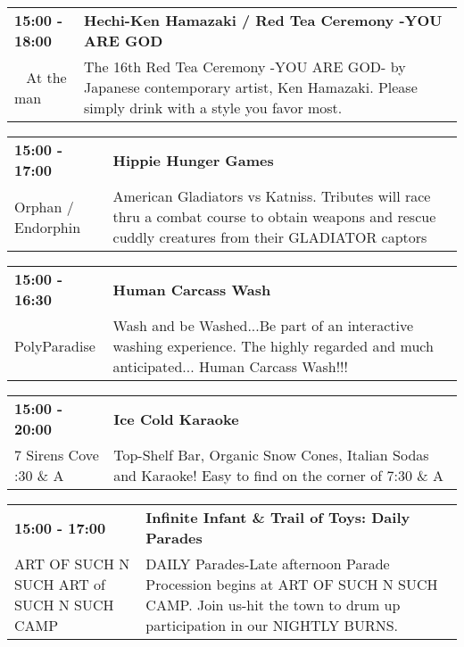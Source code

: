 \begin{tabular}{ p{1in} p{2.2in} }
    \textbf{15:00 - 18:00} & \textbf{Hechi-Ken Hamazaki / Red Tea Ceremony -YOU ARE GOD} \\
    ~ \newline At the man & The 16th Red Tea Ceremony -YOU ARE GOD- by Japanese contemporary artist, Ken Hamazaki. Please simply drink with a style you favor most. \\
    \hline 
\end{tabular}
    
\begin{tabular}{ p{1in} p{2.2in} }
    \textbf{15:00 - 17:00} & \textbf{Hippie Hunger Games} \\
    Orphan / Endorphin \newline  & American Gladiators vs Katniss. Tributes will race thru a combat course to obtain weapons and rescue cuddly creatures from their GLADIATOR captors \\
    \hline 
\end{tabular}
    
\begin{tabular}{ p{1in} p{2.2in} }
    \textbf{15:00 - 16:30} & \textbf{Human Carcass Wash} \\
    PolyParadise \newline  & Wash and be Washed...Be part of an interactive washing experience.
The highly regarded and much anticipated... Human Carcass Wash!!! \\
    \hline 
\end{tabular}
    
\begin{tabular}{ p{1in} p{2.2in} }
    \textbf{15:00 - 20:00} & \textbf{Ice Cold Karaoke} \\
    7 Sirens Cove \newline 7:30 \& A & Top-Shelf Bar, Organic Snow Cones, Italian Sodas and Karaoke! Easy to find on the corner of 7:30 \& A \\
    \hline 
\end{tabular}
    
\begin{tabular}{ p{1in} p{2.2in} }
    \textbf{15:00 - 17:00} & \textbf{Infinite Infant \& Trail of Toys: Daily Parades} \\
    ART OF SUCH N SUCH \newline ART of SUCH N SUCH CAMP & DAILY Parades-Late afternoon
Parade Procession begins at ART OF SUCH N SUCH CAMP. Join us-hit the town to drum up participation in our NIGHTLY BURNS. \\
    \hline 
\end{tabular}
    
